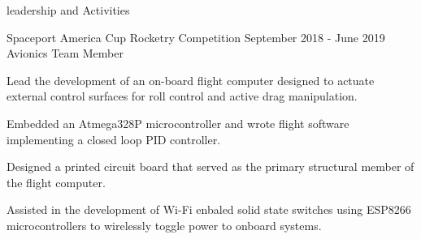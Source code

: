 \documentclass{resume} %
\begin{document}
\begin{rSection} {leadership and Activities}
\begin{rSubsection} {Spaceport America Cup Rocketry Competition} {September 2018 - June 2019} {Avionics Team Member}
        \item Lead the development of an on-board flight computer designed to actuate external control surfaces for roll control and active drag manipulation.
        \item Embedded an Atmega328P microcontroller and wrote flight software implementing a closed loop PID controller.
        \item Designed a printed circuit board that served as the primary structural member of the flight computer.
        \item Assisted in the development of Wi-Fi enbaled solid state switches using ESP8266 microcontrollers to wirelessly toggle power to onboard systems.

    \end{rSubsection}

\end{rSection}
\end{document}
